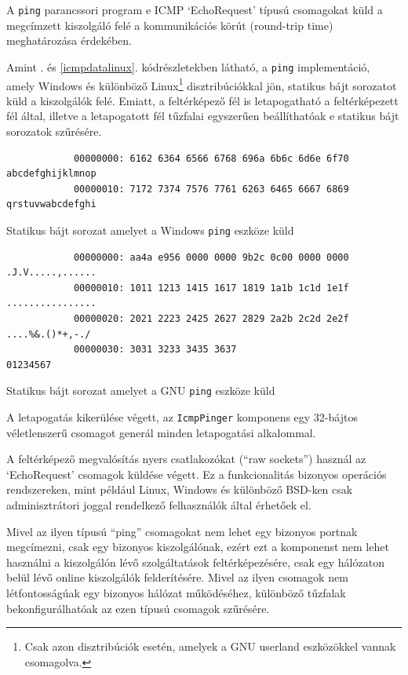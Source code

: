 \documentclass[a4paper,12pt]{article}
\begin{document}
	A \texttt{ping} parancssori program e ICMP `EchoRequest' típusú csomagokat küld a megcímzett kiszolgáló felé a kommunikációs körút (round-trip time) meghatározása érdekében.
	
	Amint \az{\ref{icmpdatawindows}}. és \ref{icmpdatalinux}. kódrészletekben látható, a \texttt{ping} implementáció, amely Windows és különböző Linux\footnote{Csak azon disztribúciók esetén, amelyek a GNU userland eszközökkel vannak csomagolva.} disztribúciókkal jön, statikus bájt sorozatot küld a kiszolgálók felé. Emiatt, a feltérképező fél is letapogatható a feltérképezett fél által, illetve a letapogatott fél tűzfalai egyszerűen beállíthatóak e statikus bájt sorozatok szűrésére.
	
	\begin{listing}[H]
		\begin{verbatim}
			00000000: 6162 6364 6566 6768 696a 6b6c 6d6e 6f70  abcdefghijklmnop
			00000010: 7172 7374 7576 7761 6263 6465 6667 6869  qrstuvwabcdefghi
		\end{verbatim}
		\caption{Statikus bájt sorozat amelyet a Windows \texttt{ping} eszköze küld}
		\label{icmpdatawindows}
	\end{listing}
	
	\begin{listing}[H]
		\begin{verbatim}
			00000000: aa4a e956 0000 0000 9b2c 0c00 0000 0000  .J.V.....,......
			00000010: 1011 1213 1415 1617 1819 1a1b 1c1d 1e1f  ................
			00000020: 2021 2223 2425 2627 2829 2a2b 2c2d 2e2f   ....%&.()*+,-./
			00000030: 3031 3233 3435 3637                      01234567
		\end{verbatim}
		\caption{Statikus bájt sorozat amelyet a GNU \texttt{ping} eszköze küld}
		\label{icmpdatalinux}
	\end{listing}
	
	A letapogatás kikerülése végett, az \texttt{IcmpPinger} komponens egy 32-bájtos véletlenszerű csomagot generál minden letapogatási alkalommal.
	
	A feltérképező megvalósítás nyers csatlakozókat (``raw sockets'') használ az `EchoRequest' csomagok küldése végett. Ez a funkcionalitás bizonyos operációs rendszereken, mint például Linux, Windows és különböző BSD-ken csak adminisztrátori joggal rendelkező felhasználók által érhetőek el.

	Mivel az ilyen típusú ``ping'' csomagokat nem lehet egy bizonyos portnak megcímezni, csak egy bizonyos kiszolgálónak, ezért ezt a komponenst nem lehet használni a kiszolgálón lévő szolgáltatások feltérképezésére, csak egy hálózaton belül lévő online kiszolgálók felderítésére. Mivel az ilyen csomagok nem létfontosságúak egy bizonyos hálózat működéséhez, különböző tűzfalak bekonfigurálhatóak az ezen típusú csomagok szűrésére.
\end{document}
